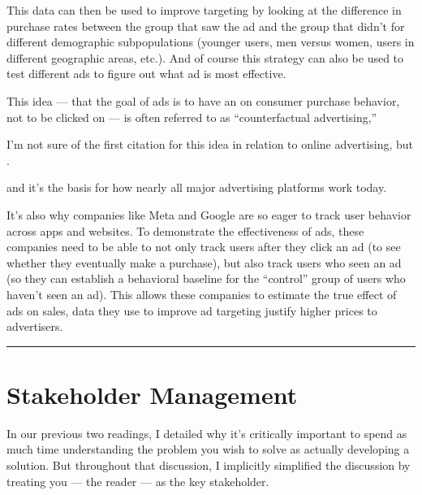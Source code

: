 \documentclass[letterpaper,10pt,english]{jupyterBook}
\begin{document}
\sphinxAtStartPar
This data can then be used to improve targeting by looking at the difference in purchase rates between the group that saw the ad and the group that didn’t for different demographic sub\sphinxhyphen{}populations (younger users, men versus women, users in different geographic areas, etc.). And of course this strategy can also be used to test different ads to figure out what ad is most effective.

\sphinxAtStartPar
This idea — that the goal of ads is to have an  on consumer purchase behavior, not to be clicked on — is often referred to as “counter\sphinxhyphen{}factual advertising,”%
\begin{footnote}[3]\sphinxAtStartFootnote
I’m not sure of the first citation for this idea in relation to online advertising, but .
%
\end{footnote} and it’s the basis for how nearly all major advertising platforms work today.

\sphinxAtStartPar
It’s also why companies like Meta and Google are so eager to track user behavior across apps and websites. To demonstrate the effectiveness of ads, these companies need to be able to not only track users after they click an ad (to see whether they eventually make a purchase), but also track users who  seen an ad (so they can establish a behavioral baseline for the “control” group of users who haven’t seen an ad). This allows these companies to estimate the true effect of ads on sales, data they use to improve ad targeting  justify higher prices to advertisers.




\bigskip\hrule\bigskip


\sphinxstepscope


\chapter{Stakeholder Management}
\label{\detokenize{20_problems_to_questions/20_stakeholder_management:stakeholder-management}}\label{\detokenize{20_problems_to_questions/20_stakeholder_management::doc}}
\sphinxAtStartPar
In our previous two readings, I detailed why it’s critically important to spend as much time understanding the problem you wish to solve as actually developing a solution. But throughout that discussion, I implicitly simplified the discussion by treating you — the reader — as the key stakeholder.
\end{document}
